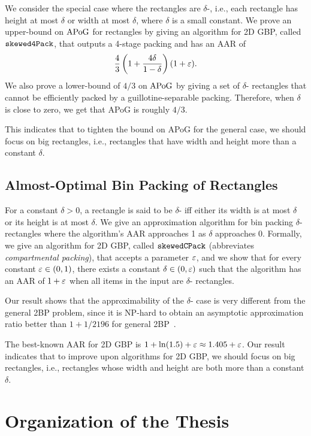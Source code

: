 We consider the special case where the rectangles are $\delta$-\thin,
i.e., each rectangle has height at most $\delta$ or width at most $\delta$,
where $\delta$ is a small constant.
We prove an upper-bound on $\mathrm{APoG}$ for \thin{} rectangles by
giving an algorithm for 2D GBP, called $\operatorname{\mathtt{skewed4Pack}}$,
that outputs a 4-stage packing and has an AAR of
\[ \frac{4}{3}\left(1+\frac{4\delta}{1-\delta}\right)(1+\varepsilon). \]
We also prove a lower-bound of $4/3$ on $\mathrm{APoG}$ by giving
a set of $\delta$-\thin{} rectangles that cannot be efficiently
packed by a guillotine-separable packing.
Therefore, when $\delta$ is close to zero, we get that APoG is roughly $4/3$.

This indicates that to tighten the bound on APoG for the general case,
we should focus on big rectangles, i.e., rectangles that have width and height
more than a constant $\delta$.

\subsection{Almost-Optimal Bin Packing of \Thin{} Rectangles}

\newcommand{\thinBPIntro}{
For a constant $\delta > 0$, a rectangle is said to be $\delta$-\thin{}
iff either its width is at most $\delta$ or its height is at most $\delta$.
We give an approximation algorithm for bin packing $\delta$-\thin{} rectangles
where the algorithm's AAR approaches 1 as $\delta$ approaches 0.
Formally, we give an algorithm for 2D GBP, called $\thinCPack$
(abbreviates \emph{\thin{} compartmental packing}),
that accepts a parameter $\eps$, and we show that for every constant $\eps \in (0, 1)$,
there exists a constant $\delta \in (0, \eps)$ such that the algorithm has an AAR of $1+\eps$
when all items in the input are $\delta$-\thin{} rectangles.

Our result shows that the approximability of the $\delta$-\thin{} case is very different from
the general 2BP problem, since it is NP-hard to obtain
an asymptotic approximation ratio better than
$1 + 1/2196$ for general 2BP~\cite{chlebik2009hardness}.

The best-known AAR for 2D GBP is $1 + \ln(1.5) + \eps \approx 1.405 + \eps$.
Our result indicates that to improve upon algorithms for 2D GBP,
we should focus on big rectangles, i.e., rectangles whose
width and height are both more than a constant $\delta$.%
}
\thinBPIntro

\section{Organization of the Thesis}

